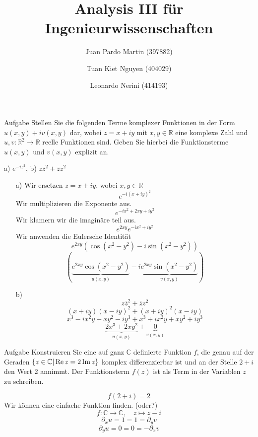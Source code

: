 \documentclass{scrartcl}
\title{Analysis III für Ingenieurwissenschaften}
\author{Juan Pardo Martin (397882)\and Tuan Kiet Nguyen (404029)\and Leonardo Nerini (414193)}
\def\mbb#1{\mathbb{#1}}
\def\bC{\mbb{C}}
\newcommand{\func}[3]{#1\colon#2\to#3}
\newcommand{\vfunc}[5]{\func{#1}{#2}{#3},\quad#4\longmapsto#5}
\begin{document}
\maketitle

\begin{section}{Aufgabe}%
Stellen Sie die folgenden Terme komplexer Funktionen in der Form \(u(x, y)+iv(x, y)\) dar,
wobei \(z = x + iy\) mit \(x, y \in \mathbb R\) eine komplexe Zahl und \(u, v : \mathbb R^2 \rightarrow \mathbb R\) reelle Funktionen
sind. Geben Sie hierbei die Funktionsterme \(u(x, y)\) und \(v(x, y)\) explizit an.
\begin{center}
a) \(e^{-i z^2}\),    b) \(z\overline{z}^2+\overline{z}z^2\)
\end{center}
\begin{itemize}
\item[a)]
Wir ersetzen \(z=x+iy\), wobei \(x,y\in \mathbb R\)
\[e^{-i (x+i y)^2}\]
Wir multiplizieren die Exponente aus.
\[e^{-i x^2+2 x y+i y^2}\]
Wir klamern wir die imaginäre teil aus.
\[e^{2 x y} e^{-i x^2+i y^2}\]
Wir anwenden die Eulersche Identität
\[e^{2 x y} \left(\cos \left(x^2-y^2\right)-i \sin \left(x^2-y^2\right)\right)\]
\[\left(\underbrace{e^{2 x y} \cos \left(x^2-y^2\right)}_{u(x,y)}-i \underbrace{e^{2 x y}\sin \left(x^2-y^2\right)}_{v(x,y)}\right)\]
\newpage
\item[b)]
\[z\overline{z}^2+\overline{z}z^2\]
\[(x+i y) (x-i y)^2+(x+i y)^2 (x-i y)\]
\[x^3-i x^2 y+x y^2-i y^3+x^3+i x^2 y+x y^2+i y^3\]
\[\underbrace{2 x^3 + 2 x y^2}_{u(x,y)}+\underbrace{0}_{v(x,y)}\]
\end{itemize}
\end{section}
\begin{section}{Aufgabe}%
Konstruieren Sie eine auf ganz $\bC$ definierte Funktion $f$, die genau auf der Geraden \(\qty{z \in
\mathbb C | \Re z = 2 \Im z}\) komplex differenzierbar ist 
und an der Stelle \(2 + i\) den Wert 2 annimmt. Der Funktionsterm 
$f(z)$ ist als Term in der Variablen $z$ zu schreiben.

\[f(2+i)=2\]
Wir können eine einfache Funktion finden. (oder?)
\[\vfunc{f}{\bC}{\bC}{z}{z-i}\]
\[\partial_x u = 1 = 1 = \partial_y v\]
\[\partial_y u = 0 = 0 = - \partial_x v\]
\end{section}
\end{document}
